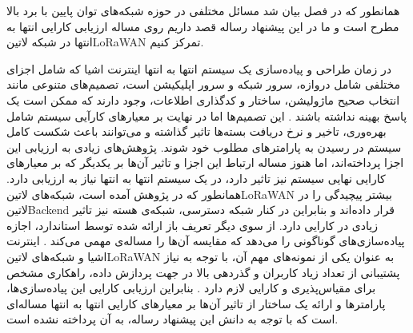 
همانطور که در فصل  بیان شد مسائل مختلفی در حوزه شبکه‌های توان پایین با برد بالا مطرح است و ما در این پیشنهاد رساله قصد داریم روی مساله ارزیابی کارایی انتها به انتها
در شبکه ‌لاتین{LoRaWAN} تمرکز کنیم.


در زمان طراحی و پیاده‌سازی یک سیستم انتها به انتها اینترنت اشیا که شامل اجزای مختلفی شامل دروازه، سرور شبکه و سرور اپلیکیشن است،
تصمیم‌های متنوعی مانند انتخاب صحیح ماژولیشن، ساختار و کدگذاری اطلاعات، وجود دارند که ممکن است
یک پاسخ بهینه نداشته باشند . این تصمیم‌ها اما در نهایت بر معیارهای کارآیی سیستم شامل بهره‌وری، تاخیر و نرخ دریافت بسته‌ها تاثیر گذاشته و می‌توانند
باعث شکست کامل سیستم در رسیدن به پارامترهای مطلوب خود شوند.
پژوهش‌های زیادی به ارزیابی این اجزا پرداخته‌اند، اما هنوز
مساله ارتباط این اجزا و تاثیر آن‌ها بر یکدیگر که بر معیارهای کارایی نهایی سیستم نیز تاثیر دارد، در یک سیستم انتها به انتها نیاز به ارزیابی دارد.
همانطور که در پژوهش  آمده است، شبکه‌های ‌لاتین{LoRaWAN} بیشتر پیچیدگی را
در ‌لاتین{Backend} قرار داده‌اند و بنابراین در کنار شبکه دسترسی، شبکه‌ی هسته نیز تاثیر زیادی در کارایی دارد.
از سوی دیگر تعریف باز ارائه شده توسط استاندارد، اجازه پیاده‌سازی‌های گوناگونی را می‌دهد که مقایسه آن‌ها را مساله‌ی مهمی می‌کند
.
اینترنت اشیا و شبکه‌های ‌لاتین{LoRaWAN} به عنوان یکی از نمونه‌های مهم آن،
با توجه به نیاز پشتیبانی از تعداد زیاد کاربران و گذردهی بالا در جهت پردازش داده، راهکاری مشخص برای مقیاس‌پذیری و کارایی لازم دارد
.
بنابراین ارزیابی کارایی این پیاده‌سازی‌ها، پارامترها و ارائه یک ساختار از تاثیر آن‌ها بر معیارهای کارایی انتها به انتها
مساله‌ای است که با توجه به دانش این پیشنهاد رساله، به آن پرداخته نشده است.

